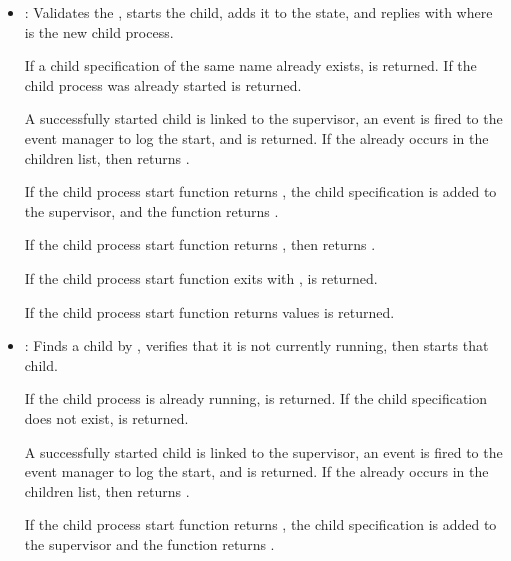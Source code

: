 \antipar
\begin{itemize}
  \item{}: Validates the
    , starts the child, adds it to the state, and
    replies with  where  is the new
    child process.

    If a child specification of the same name already exists,
     is returned. If the child
    process was already started  is returned.

    A successfully started child is linked to the supervisor, an event
    is fired to the event manager to log the start, and  is returned. If the  already occurs in the
    children list, then  returns .

    If the child process start function returns , the
    child specification is added to the supervisor, and the function
    returns .

    If the child process start function returns , then  returns
    .

    If the child process start function exits with ,
     is returned.

    If the child process start function returns  values
     is returned.

  \item{}: Finds a child by
    , verifies that it is not currently running, then starts
    that child.

    If the child process is already running,  is returned.  If the child specification does not
    exist,  is returned.

    A successfully started child is linked to the supervisor, an event
    is fired to the event manager to log the start, and  is returned. If the  already occurs in the
    children list, then  returns .

    If the child process start function returns , the
    child specification is added to the supervisor and the function
    returns .


\end{itemize}
